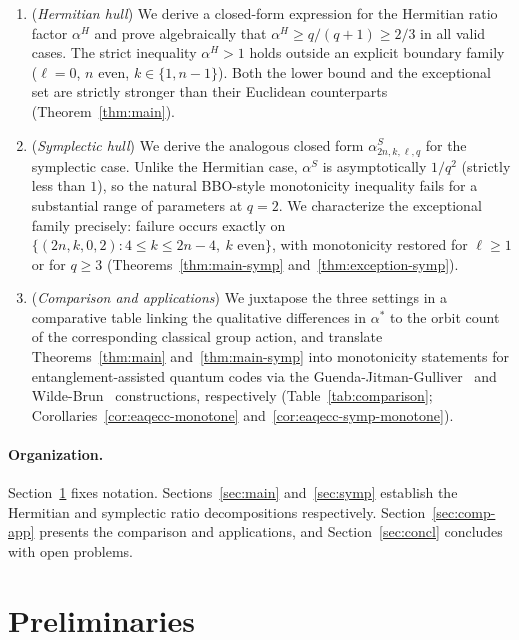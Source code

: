 \documentclass[11pt]{article}
\theoremstyle{plain}
\theoremstyle{remark}
\begin{document}
\begin{enumerate}
\item[(i)] (\emph{Hermitian hull}) We derive a closed-form expression for the Hermitian ratio factor $\alpha^H$ and prove algebraically that $\alpha^H \geq q/(q+1) \geq 2/3$ in all valid cases.
The strict inequality $\alpha^H > 1$ holds outside an explicit boundary family ($\ell = 0$, $n$ even, $k \in \{1, n-1\}$). Both the lower bound and the exceptional set are strictly stronger than their Euclidean counterparts (Theorem~\ref{thm:main}).

\item[(ii)] (\emph{Symplectic hull}) We derive the analogous closed form
$\alpha^S_{2n,k,\ell,q}$ for the symplectic case. Unlike the Hermitian case, $\alpha^S$ is asymptotically $1/q^2$ (strictly less than $1$), so the natural BBO-style monotonicity inequality fails for a substantial range of parameters at $q = 2$.
We characterize the exceptional family precisely: failure occurs exactly on
$\{(2n, k, 0, 2) : 4 \leq k \leq 2n - 4,\ k \text{ even}\}$, with monotonicity restored for $\ell \geq 1$ or for $q \geq 3$
(Theorems~\ref{thm:main-symp} and~\ref{thm:exception-symp}).

\item[(iii)] (\emph{Comparison and applications}) We juxtapose the three
settings in a comparative table linking the qualitative differences in
$\alpha^*$ to the orbit count of the corresponding classical group action,
and translate Theorems~\ref{thm:main} and~\ref{thm:main-symp} into
monotonicity statements for entanglement-assisted quantum codes via the
Guenda-Jitman-Gulliver~\cite{Dcc-EAqecc} and
Wilde-Brun~\cite{WildeBrun2008} constructions, respectively
(Table~\ref{tab:comparison};
Corollaries~\ref{cor:eaqecc-monotone} and~\ref{cor:eaqecc-symp-monotone}).
\end{enumerate}

\paragraph{Organization.}
Section~\ref{sec:prelim} fixes notation. Sections~\ref{sec:main}
and~\ref{sec:symp} establish the Hermitian and symplectic ratio decompositions
respectively. Section~\ref{sec:comp-app} presents the comparison and
applications, and Section~\ref{sec:concl} concludes with open problems.

\section{Preliminaries} \label{sec:prelim}
\end{document}
